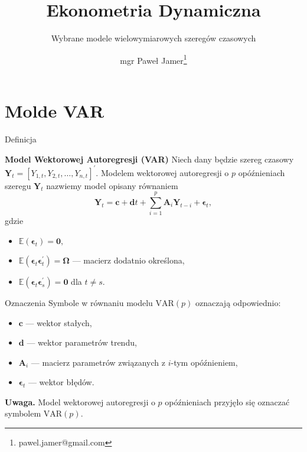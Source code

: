 \documentclass[a4paper, 11pt]{beamer}
\title{Ekonometria Dynamiczna}
\subtitle{Wybrane modele wielowymiarowych szeregów czasowych}
\author{mgr Paweł Jamer\thanks{pawel.jamer@gmail.com}}
\begin{document}
	\begin{frame}
		\titlepage
	\end{frame}

	\section{Molde VAR}

	\begin{frame}{Definicja}
		\begin{block}{\textbf{Model Wektorowej Autoregresji (VAR)}}
			Niech dany będzie szereg czasowy $\boldsymbol{Y}_{t} = 
			\left[Y_{1,t}, Y_{2,t}, \ldots, Y_{n,t}\right]^{\prime}.$ 
			Modelem wektorowej autoregresji o $p$ opóźnieniach szeregu 
			$\boldsymbol{Y}_{t}$ nazwiemy model opisany równaniem
			\[
				\boldsymbol{Y}_{t} =
					\boldsymbol{c} +
					\boldsymbol{d} t +
					\sum_{i=1}^{p}
						\boldsymbol{A}_{i} \boldsymbol{Y}_{t-i} +
						\boldsymbol{\epsilon}_{t},
			\]
			gdzie
			\begin{itemize}
				\item $\mathbb{E}\left(\boldsymbol{\epsilon}_{t}\right) = 
					\boldsymbol{0},$
				\item $\mathbb{E}\left(
					\boldsymbol{\epsilon}_{t}
					\boldsymbol{\epsilon}_{t}^{\prime}
				\right) = \boldsymbol{\Omega}$ --- macierz dodatnio 
				określona,
				\item $\mathbb{E}\left(
					\boldsymbol{\epsilon}_{t}
					\boldsymbol{\epsilon}_{s}^{\prime}
				\right) = \boldsymbol{0}$ dla $t \neq s.$
			\end{itemize}
		\end{block}
	\end{frame}
	
	\begin{frame}{Oznaczenia}
		Symbole w równaniu modelu $\mbox{VAR}\left(p\right)$ 
		oznaczają odpowiednio:
		\begin{itemize}
			\item $\boldsymbol{c}$ --- wektor stałych,
			\item $\boldsymbol{d}$ --- wektor parametrów trendu,
			\item $\boldsymbol{A}_{i}$ --- macierz parametrów 
				związanych z $i$-tym opóźnieniem,
			\item $\boldsymbol{\epsilon}_{t}$ --- wektor błędów.
		\end{itemize}
		\begin{alert}{\textbf{Uwaga.}}
			Model wektorowej autoregresji o $p$ opóźnieniach przyjęło 
			się oznaczać symbolem $\mbox{VAR}\left(p\right).$
		\end{alert}
	\end{frame}
	
\end{document}
